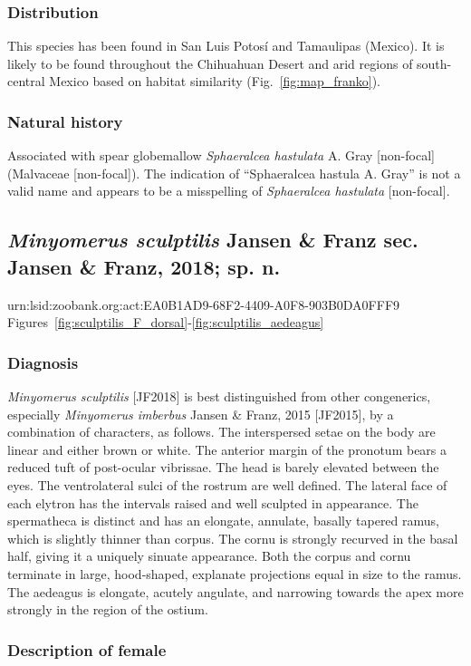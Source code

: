 \documentclass[fleqn,10pt,lineno]{wlpeerj} %
\begin{document}
		\subsubsection*{Distribution}
			This species has been found in San Luis Potos\'{i} and Tamaulipas (Mexico).
			It is likely to be found throughout the Chihuahuan Desert and arid regions of south-central Mexico based on habitat similarity (Fig.~\ref{fig:map_franko}).
		\subsubsection*{Natural history}
			Associated with spear globemallow \textit{Sphaeralcea hastulata} A. Gray [non-focal] (Malvaceae [non-focal]).
			The indication of ``Sphaeralcea hastula A. Gray'' is not a valid name and appears to be a misspelling of \textit{Sphaeralcea hastulata} [non-focal].

	\subsection*{\textit{Minyomerus sculptilis} Jansen \& Franz sec. Jansen \& Franz, 2018; sp. n.}\label{ssec:sculpt}
		urn:lsid:zoobank.org:act:EA0B1AD9-68F2-4409-A0F8-903B0DA0FFF9\\
		Figures~\ref{fig:sculptilis_F_dorsal}-\ref{fig:sculptilis_aedeagus}
		\subsubsection*{Diagnosis}
			\textit{Minyomerus sculptilis} [JF2018] is best distinguished from other congenerics, especially \textit{Minyomerus imberbus} Jansen \& Franz, 2015 [JF2015], by a combination of characters, as follows.
			The interspersed setae on the body are linear and either brown or white.
			The anterior margin of the pronotum bears a reduced tuft of post-ocular vibrissae.
			The head is barely elevated between the eyes.
			The ventrolateral sulci of  the rostrum are well defined.
			The lateral face of each elytron has the intervals raised and well sculpted in appearance.
			The spermatheca is distinct and has an elongate, annulate, basally tapered ramus, which is slightly thinner than corpus.
			The cornu is strongly recurved in the basal half, giving it a uniquely sinuate appearance.
			Both the corpus and cornu terminate in large, hood-shaped, explanate projections equal in size to the ramus.
			The aedeagus is elongate, acutely angulate, and narrowing towards the apex more strongly in the region of the ostium.
		\subsubsection*{Description of female}
\end{document}
